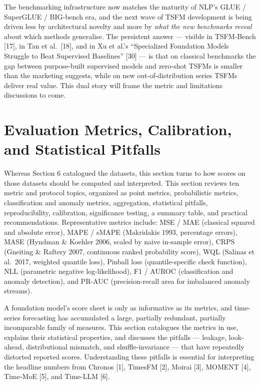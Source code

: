The benchmarking infrastructure now matches the maturity of NLP's GLUE / SuperGLUE / BIG-bench era, and the next wave of TSFM development is being driven less by architectural novelty and more by \emph{what the new benchmarks reveal} about which methods generalise. The persistent answer --- visible in TSFM-Bench {[}17{]}, in Tan et al.~{[}18{]}, and in Xu et al.'s ``Specialized Foundation Models Struggle to Beat Supervised Baselines'' {[}30{]} --- is that on classical benchmarks the gap between purpose-built supervised models and zero-shot TSFMs is smaller than the marketing suggests, while on new out-of-distribution series TSFMs deliver real value. This dual story will frame the metric and limitations discussions to come.

\section{Evaluation Metrics, Calibration, and Statistical Pitfalls}\label{evaluation-metrics-calibration-and-statistical-pitfalls}

Whereas Section 6 catalogued the datasets, this section turns to how scores on those datasets should be computed and interpreted. This section reviews ten metric and protocol topics, organized as point metrics, probabilistic metrics, classification and anomaly metrics, aggregation, statistical pitfalls, reproducibility, calibration, significance testing, a summary table, and practical recommendations. Representative metrics include: MSE / MAE (classical squared and absolute error), MAPE / sMAPE (Makridakis 1993, percentage errors), MASE (Hyndman \& Koehler 2006, scaled by naive in-sample error), CRPS (Gneiting \& Raftery 2007, continuous ranked probability score), WQL (Salinas et al.~2017, weighted quantile loss), Pinball loss (quantile-specific check function), NLL (parametric negative log-likelihood), F1 / AUROC (classification and anomaly detection), and PR-AUC (precision-recall area for imbalanced anomaly streams).

A foundation model's score sheet is only as informative as its metrics, and time-series forecasting has accumulated a large, partially redundant, partially incomparable family of measures. This section catalogues the metrics in use, explains their statistical properties, and discusses the pitfalls --- leakage, look-ahead, distributional mismatch, and shuffle-invariance --- that have repeatedly distorted reported scores. Understanding these pitfalls is essential for interpreting the headline numbers from Chronos {[}1{]}, TimesFM {[}2{]}, Moirai {[}3{]}, MOMENT {[}4{]}, Time-MoE {[}5{]}, and Time-LLM {[}6{]}.

